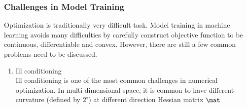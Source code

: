 \subsubsection{Challenges in Model Training}

Optimization is traditionally very difficult task. Model training in machine learning avoids many difficulties by carefully construct objective function to be continuous, differentiable and convex. However, there are still a few common problems need to be discussed. 

\begin{enumerate}
    \item Ill conditioning\\
Ill conditioning is one of the most common challenges in numerical optimization. In multi-dimensional space, it is common to have different curvature (defined by $2^\circ$) at different direction
Hessian matrix $\mat$
\end{enumerate}

